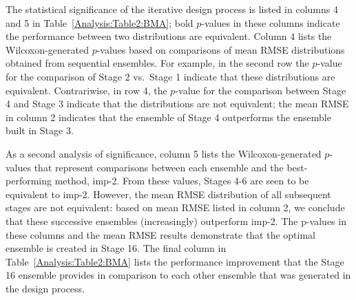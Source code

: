 \documentclass[journal=jpcbfk, manuscript=article]{achemso}
\newcommand{\+}[1]{\ensuremath{\mathbf{#1}}}
\begin{document}
The statistical significance of the iterative design process is listed in columns 4 and 5 in Table~\ref{Analysis:Table2:BMA}; bold $p$-values in these columns indicate the performance between two distributions are equivalent.
Column 4 lists the Wilcoxon-generated $p$-values based on comparisons of mean RMSE distributions obtained from sequential ensembles.
For example, in the second row the $p$-value for the comparison of Stage 2 vs.~Stage 1 indicate that these distributions are equivalent.
Contrariwise, in row 4, the $p$-value for the comparison between Stage 4 and Stage 3 indicate that the distributions are not equivalent; the mean RMSE in column 2 indicates that the ensemble of Stage 4 outperforms the ensemble built in Stage 3.

As a second analysis of significance, column 5 lists the Wilcoxon-generated $p$-values that represent comparisons between each ensemble and the best-performing method, imp-2.
From these values, Stages 4-6 are seen to be equivalent to imp-2.
However, the mean RMSE distribution of all subsequent stages are not equivalent: based on mean RMSE listed in column 2, we conclude that these successive ensembles (increasingly) outperform imp-2.
The p-values in these columns and the mean RMSE results demonstrate that the optimal ensemble is created in Stage 16.
The final column in Table~\ref{Analysis:Table2:BMA} lists the performance improvement that the Stage 16 ensemble provides in comparison to each other ensemble that was generated in the design process.
\end{document}
